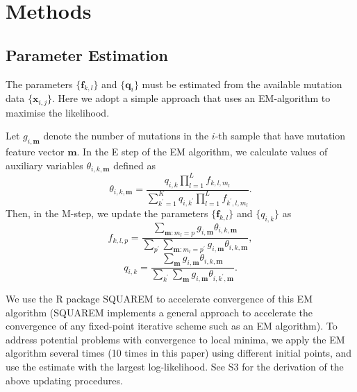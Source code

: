 \documentclass[10pt,letterpaper]{article}
\begin{document}
\section*{Methods}




\subsection*{Parameter Estimation}

The parameters $\{ \bm{f}_{k, l} \}$ and $\{ \bm{q}_i \}$
must be estimated from the available mutation data $\{ \bm{x}_{i,j} \}$. 
Here we adopt a simple approach that uses an EM-algorithm to maximise the likelihood. 

Let $g_{i, \bm{m}}$ denote the number of mutations in the $i$-th sample that have mutation feature vector $\bm{m}$.
In the E step of the EM algorithm, we calculate values of auxiliary variables $\theta_{i, k, \bm{m}}$ defined as
\begin{equation}
\theta_{i, k, \bm{m}} = \frac{  q_{i,k} \prod_{l=1}^L f_{k,l,m_l} }{ \sum_{k^{\prime} = 1}^K q_{i, k^{\prime} } \prod_{l=1}^L f_{k^{\prime}, l, m_l } }.
\end{equation}
Then, in the M-step, we update the parameters $\{ \bm{f}_{k, l} \}$ and $\{ q_{i, k} \}$ as
\begin{equation}
f_{k, l, p} = \frac{ \sum_{\bm{m} : m_l = p} g_{i, \bm{m}} \theta_{i, k, \bm{m}} }{ \sum_{p^{\prime} } 
\sum_{\bm{m} : m_l = p^{\prime}}  g_{i, \bm{m}}\theta_{i, k, \bm{m}} },
\end{equation}
\begin{equation}
q_{i, k} = \frac{ \sum_{\bm{m}} g_{i, \bm{m}} \theta_{i, k, \bm{m} } }{  \sum_{k^{\prime} }\sum_{\bm{m}} g_{i, \bm{m}} \theta_{i, k^{\prime}, \bm{m} } }.
\end{equation}

We use the R package SQUAREM \cite{varadhan2008simple} to accelerate
convergence of this EM algorithm (SQUAREM implements a general approach to accelerate the convergence of any fixed-point iterative scheme such as an EM algorithm).
To address potential problems with convergence to local minima,
we apply the EM algorithm several times (10 times in this paper) using different initial points,
and use the estimate with the largest log-likelihood.
See S3 for the derivation of the above updating procedures.
\end{document}
